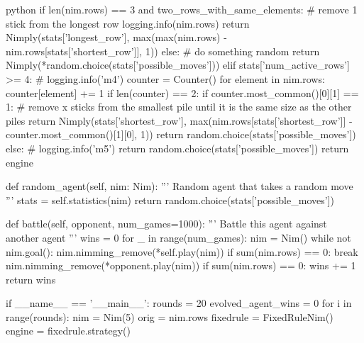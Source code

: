 \begin{mintedbox}{python}
                    if len(nim.rows) == 3 and two_rows_with_same_elements:
                        # remove 1 stick from the longest row
                        logging.info(nim.rows)
                        return Nimply(stats['longest_row'], max(max(nim.rows) - nim.rows[stats['shortest_row']], 1))
                    else:
                        # do something random
                        return Nimply(*random.choice(stats['possible_moves']))
                elif stats['num_active_rows'] >= 4:
                    # logging.info('m4')
                    counter = Counter()
                    for element in nim.rows:
                        counter[element] += 1
                    if len(counter) == 2:
                        if counter.most_common()[0][1] == 1:
                            # remove x sticks from the smallest pile until it is the same size as the other piles
                            return Nimply(stats['shortest_row'], max(nim.rows[stats['shortest_row']] - counter.most_common()[1][0], 1))
                    return random.choice(stats['possible_moves'])
                else:
                    # logging.info('m5')
                    return random.choice(stats['possible_moves'])
            return engine

        def random_agent(self, nim: Nim):
            '''
            Random agent that takes a random move
            '''
            stats = self.statistics(nim)
            return random.choice(stats['possible_moves'])

        def battle(self, opponent, num_games=1000):
            '''
            Battle this agent against another agent
            '''
            wins = 0
            for _ in range(num_games):
                nim = Nim()
                while not nim.goal():
                    nim.nimming_remove(*self.play(nim))
                    if sum(nim.rows) == 0:
                        break
                    nim.nimming_remove(*opponent.play(nim))
                if sum(nim.rows) == 0:
                    wins += 1
            return wins

    if __name__ == '__main__':
        rounds = 20
        evolved_agent_wins = 0
        for i in range(rounds):
            nim = Nim(5)
            orig = nim.rows
            fixedrule = FixedRuleNim()
            engine = fixedrule.strategy()


\end{mintedbox}

